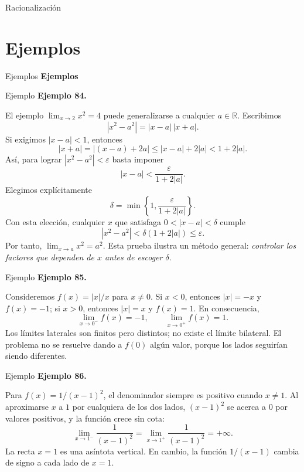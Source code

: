 \documentclass[12pt,aspectratio=169]{beamer}
\newcommand{\R}{\mathbb{R}}
\begin{document}
\begin{frame}[t,allowframebreaks]{Racionalización}

\end{frame}


\section{Ejemplos}

\begin{frame}[t]{Ejemplos}
\centering\vfill{\Large\bfseries\color{azul} Ejemplos}\vfill
\end{frame}


\begin{frame}[t,allowframebreaks]{Ejemplo}
{\color{azul}\bfseries Ejemplo 84.}\par\medskip

El ejemplo $\lim_{x\to2}x^2=4$ puede generalizarse a cualquier $a\in\R$. Escribimos
\[
|x^2-a^2|=|x-a|\,|x+a|.
\]
Si exigimos $|x-a|<1$, entonces
\[
|x+a|=|(x-a)+2a|\le |x-a|+2|a|<1+2|a|.
\]
Así, para lograr $|x^2-a^2|<\varepsilon$ basta imponer
\[
|x-a|<\frac{\varepsilon}{1+2|a|}.
\]
Elegimos explícitamente
\[
\delta=\min\left\{1,\frac{\varepsilon}{1+2|a|}\right\}.
\]
Con esta elección, cualquier $x$ que satisfaga $0<|x-a|<\delta$ cumple
\[
|x^2-a^2|<\delta(1+2|a|)\le\varepsilon.
\]
Por tanto, $\lim_{x\to a}x^2=a^2$. Esta prueba ilustra un método general: \emph{controlar los factores que dependen de $x$ antes de escoger $\delta$}.
\end{frame}


\begin{frame}[t,allowframebreaks]{Ejemplo}
{\color{azul}\bfseries Ejemplo 85.}\par\medskip

Consideremos $f(x)=|x|/x$ para $x\ne0$. Si $x<0$, entonces $|x|=-x$ y $f(x)=-1$; si $x>0$, entonces $|x|=x$ y $f(x)=1$. En consecuencia,
\[
\lim_{x\to0^-}f(x)=-1,\qquad\lim_{x\to0^+}f(x)=1.
\]
Los límites laterales son finitos pero distintos; no existe el límite bilateral. El problema no se resuelve dando a $f(0)$ algún valor, porque los lados seguirían siendo diferentes.
\end{frame}


\begin{frame}[t,allowframebreaks]{Ejemplo}
{\color{azul}\bfseries Ejemplo 86.}\par\medskip

Para $f(x)=1/(x-1)^2$, el denominador siempre es positivo cuando $x\ne1$. Al aproximarse $x$ a $1$ por cualquiera de los dos lados, $(x-1)^2$ se acerca a $0$ por valores positivos, y la función crece sin cota:
\[
\lim_{x\to1^-}\frac1{(x-1)^2}
=\lim_{x\to1^+}\frac1{(x-1)^2}=+\infty.
\]
La recta $x=1$ es una asíntota vertical. En cambio, la función $1/(x-1)$ cambia de signo a cada lado de $x=1$.
\end{frame}
\end{document}
